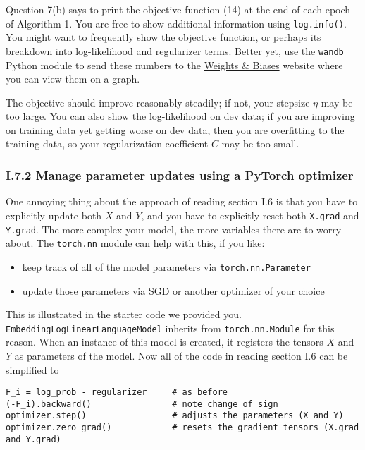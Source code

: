 Question 7(b) says to print the objective function (14) at the end of each epoch of Algorithm 1. You are free to show additional information using \texttt{log.info()}. You might want to frequently show the objective function, or perhaps its breakdown into log-likelihood and regularizer terms. Better yet, use the \texttt{wandb} Python module to send these numbers to the \href{https://wandb.ai}{Weights \& Biases} website where you can view them on a graph.

The objective should improve reasonably steadily; if not, your stepsize $\eta$ may be too large. You can also show the log-likelihood on dev data; if you are improving on training data yet getting worse on dev data, then you are overfitting to the training data, so your regularization coefficient $C$ may be too small.

\subsubsection*{I.7.2 Manage parameter updates using a PyTorch optimizer}

One annoying thing about the approach of reading section I.6 is that you have to explicitly update both $X$ and $Y$, and you have to explicitly reset both \texttt{X.grad} and \texttt{Y.grad}. The more complex your model, the more variables there are to worry about. The \texttt{torch.nn} module can help with this, if you like:

\begin{itemize}
  \item keep track of all of the model parameters via \texttt{torch.nn.Parameter}
  \item update those parameters via SGD or another optimizer of your choice
\end{itemize}

This is illustrated in the starter code we provided you. \texttt{EmbeddingLogLinearLanguageModel} inherits from \texttt{torch.nn.Module} for this reason. When an instance of this model is created, it registers the tensors $X$ and $Y$ as parameters of the model. Now all of the code in reading section I.6 can be simplified to

\begin{verbatim}
F_i = log_prob - regularizer     # as before
(-F_i).backward()                # note change of sign
optimizer.step()                 # adjusts the parameters (X and Y)
optimizer.zero_grad()            # resets the gradient tensors (X.grad and Y.grad)
\end{verbatim}


